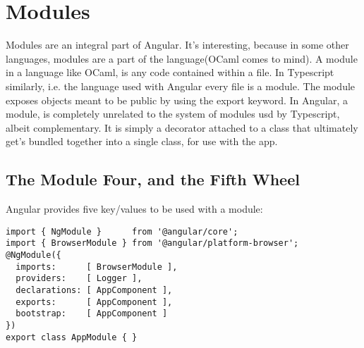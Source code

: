 \section{ Modules }
\maketitle{}

Modules are an integral part of Angular. It's interesting, because in some
other languages, modules are a part of the language(OCaml comes to mind). A
module in a language like OCaml, is any code contained within a file. In
Typescript similarly, i.e. the language used with Angular every file is a
module. The module exposes objects meant to be public by using the export
keyword. In Angular, a module, is completely unrelated to the system of modules
usd by Typescript, albeit complementary. It is simply a decorator attached to a
class that ultimately get's bundled together into a single class, for use with
the app. 

\subsection{The Module Four, and the Fifth Wheel}
Angular provides five key/values to be used with a module:
\begin{lstlisting}
import { NgModule }      from '@angular/core';
import { BrowserModule } from '@angular/platform-browser';
@NgModule({
  imports:      [ BrowserModule ],
  providers:    [ Logger ],
  declarations: [ AppComponent ],
  exports:      [ AppComponent ],
  bootstrap:    [ AppComponent ]
})
export class AppModule { }
\end{lstlisting}

